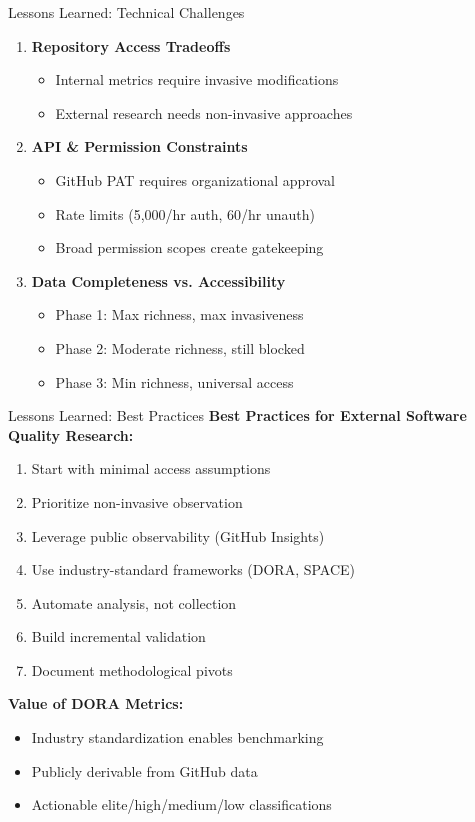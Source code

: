 \documentclass[aspectratio=169]{beamer}
\begin{document}
\begin{frame}{Lessons Learned: Technical Challenges}
  \begin{enumerate}
    \item \textbf{Repository Access Tradeoffs}
    \begin{itemize}
      \item Internal metrics require invasive modifications
      \item External research needs non-invasive approaches
    \end{itemize}

    \item \textbf{API \& Permission Constraints}
    \begin{itemize}
      \item GitHub PAT requires organizational approval
      \item Rate limits (5,000/hr auth, 60/hr unauth)
      \item Broad permission scopes create gatekeeping
    \end{itemize}

    \item \textbf{Data Completeness vs. Accessibility}
    \begin{itemize}
      \item Phase 1: Max richness, max invasiveness
      \item Phase 2: Moderate richness, still blocked
      \item Phase 3: Min richness, universal access
    \end{itemize}
  \end{enumerate}
\end{frame}

\begin{frame}{Lessons Learned: Best Practices}
  \textbf{Best Practices for External Software Quality Research:}

  \begin{enumerate}
    \item Start with minimal access assumptions
    \item Prioritize non-invasive observation
    \item Leverage public observability (GitHub Insights)
    \item Use industry-standard frameworks (DORA, SPACE)
    \item Automate analysis, not collection
    \item Build incremental validation
    \item Document methodological pivots
  \end{enumerate}

  \vspace{0.5cm}
  \textbf{Value of DORA Metrics:}
  \begin{itemize}
    \item Industry standardization enables benchmarking
    \item Publicly derivable from GitHub data
    \item Actionable elite/high/medium/low classifications
  \end{itemize}
\end{frame}
\end{document}
